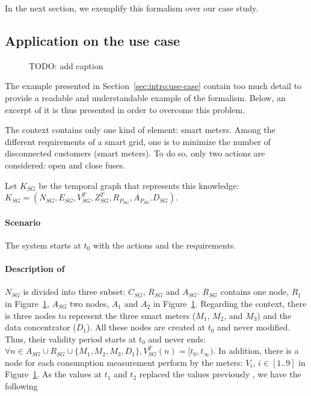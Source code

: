 In the next section, we exemplify this formalism over our case study.


\subsection{Application on the use case}
\begin{figure}
	\centering
	\caption{TODO: add caption}
	\label{fig:tkm:contextFormExample}
\end{figure}


The example presented in Section~\ref{sec:intro:use-case} contain too much detail to provide a readable and understandable example of the formalism.
Below, an excerpt of it is thus presented in order to overcome this problem.

The context contains only one kind of element: smart meters.
Among the different requirements of a smart grid, one is to minimize the number of disconnected customers (smart meters).
To do so, only two actions are considered: open and close fuses.

Let $K_{SG}$ be the temporal graph that represents this knowledge: $K_{SG} = (N_{SG}, E_{SG}, V^T_{SG}, Z^T_{SG}, R_{P_{SG}}, A_{P_{SG}}. D_{SG})$.

\paragraph{Scenario}
The system starts at $t_0$ with the actions and the requirements.

\paragraph{Description of }

$N_{SG}$ is divided into three subset: $C_{SG}$, $R_{SG}$ and $A_{SG}$.
$R_{SG}$ contains one node, $R_1$ in Figure~\ref{fig:tkm:contextFormExample}, $A_{SG}$ two nodes, $A_1$ and $A_2$ in Figure~\ref{fig:tkm:contextFormExample}.
Regarding the context, there is three nodes to represent the three smart meters ($M_1$, $M_2$, and $M_3$) and the data concentrator ($D_1$).
All these nodes are created at $t_0$ and never modified.
Thus, their validity period starts at $t_0$ and never ends: $\forall n \in A_{SG} \cup R_{SG} \cup \{M_1, M_2, M_3, D_1\}, V^T_{SG}(n) = [t_0, t_\infty)$.
In addition, there is a node for each consumption measurement perform by the meters: $V_i$, $i \in [1..9]$ in Figure~\ref{fig:tkm:contextFormExample}.
As the values at $t_1$ and $t_2$ replaced the values previously , we have the following  

